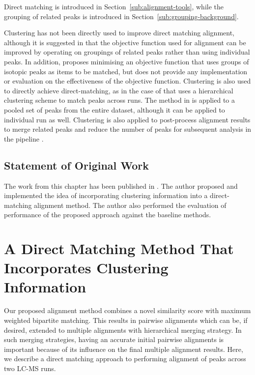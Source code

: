 Direct matching is introduced in Section~\ref{sub:alignment-tools}, while the grouping of related peaks is introduced in Section~\ref{sub:grouping-background}. 

Clustering has not been directly used to improve direct matching alignment, although it is suggested in \cite{Smith2013} that the objective function used for alignment can be improved by operating on groupings of related peaks rather than using individual peaks. In addition, \cite{Smith2015} proposes minimising an objective function that uses groups of isotopic peaks as items to be matched, but does not provide any implementation or evaluation on the effectiveness of the objective function. Clustering is also used to directly achieve direct-matching, as in the case of \cite{DeSouza2006} that uses a hierarchical clustering scheme to match peaks across runs. The method in \cite{DeSouza2006} is applied to a pooled set of peaks from the entire dataset, although it can be applied to individual run as well. Clustering is also applied to post-process alignment results to merge related peaks and reduce the number of peaks for subsequent analysis in the pipeline \cite{DeGroot2008}.

\subsection*{Statement of Original Work}

The work from this chapter has been published in \cite{wandy2015incorporating}. The author proposed and implemented the idea of incorporating clustering information into a direct-matching alignment method. The author also performed the evaluation of performance of the proposed approach against the baseline methods. 

\section{A Direct Matching Method That Incorporates Clustering Information\label{sub:direct-matching}}

Our proposed alignment method combines a novel similarity score with maximum weighted bipartite matching. This results in pairwise alignments which can be, if desired, extended to multiple alignments with hierarchical merging strategy. In such merging strategies, having an accurate initial pairwise alignments is important because of its influence on the final multiple alignment results. Here, we describe a direct matching approach to performing alignment of peaks across two LC-MS runs. 

